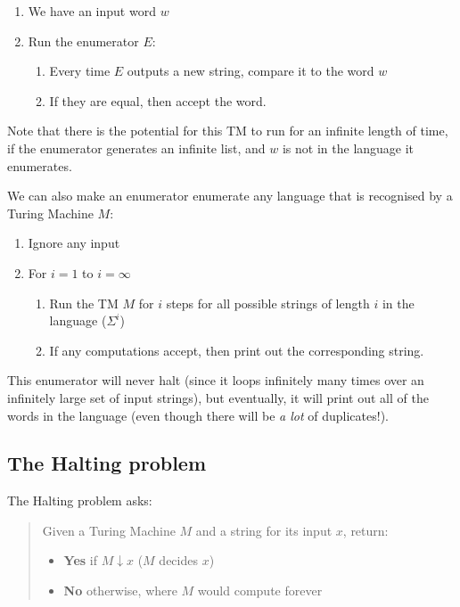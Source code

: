 \begin{enumerate}
  \item We have an input word $w$
  \item Run the enumerator $E$:
  \begin{enumerate}
    \item Every time $E$ outputs a new string, compare it to the word $w$
    \item If they are equal, then accept the word.
  \end{enumerate}
\end{enumerate}

Note that there is the potential for this TM to run for an infinite length of
time, if the enumerator generates an infinite list, and $w$ is not in the
language it enumerates.

We can also make an enumerator enumerate any language that is recognised by a
Turing Machine $M$:

\begin{enumerate}
  \item Ignore any input
  \item For $i = 1$ to $i = \infty$
  \begin{enumerate}
    \item Run the TM $M$ for $i$ steps for all possible strings of length $i$ in
      the language ($\Sigma^i$)
    \item If any computations accept, then print out the corresponding string.
  \end{enumerate}
\end{enumerate}

This enumerator will never halt (since it loops infinitely many times over an
infinitely large set of input strings), but eventually, it will print out all of
the words in the language (even though there will be \textit{a lot} of
duplicates!).

\subsection{The Halting problem}

The Halting problem asks:

\begin{quote}
  Given a Turing Machine $M$ and a string for its input $x$, return:
  \begin{itemize}
    \item[] \textbf{Yes} if $M \downarrow x$ ($M$ decides $x$)
    \item[] \textbf{No} otherwise, where $M$ would compute forever
  \end{itemize}
\end{quote}


